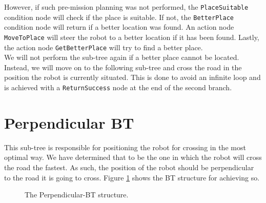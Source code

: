     However, if such pre-mission planning was not performed, the \texttt{PlaceSuitable} condition node will check if the place is suitable. If not, the \texttt{BetterPlace} condition node will return if a better location was found. An action node \texttt{MoveToPlace} will steer the robot to a better location if it has been found. Lastly, the action node \texttt{GetBetterPlace} will try to find a better place.\\
    We will not perform the sub-tree again if a better place cannot be located. Instead, we will move on to the following sub-tree and cross the road in the position the robot is currently situated. This is done to avoid an infinite loop and is achieved with a \texttt{ReturnSuccess} node at the end of the second branch.\\

\section{Perpendicular BT}
\label{sec:Perpendicular-BT}
    This sub-tree is responsible for positioning the robot for crossing in the most optimal way. We have determined that to be the one in which the robot will cross the road the fastest. As such, the position of the robot should be perpendicular to the road it is going to cross. Figure \ref{fig:Perpendicular-BT} shows the BT structure for achieving so.
    \begin{figure}[ht]
        \caption{The Perpendicular-BT structure.}
        \label{fig:Perpendicular-BT}
    \end{figure}
